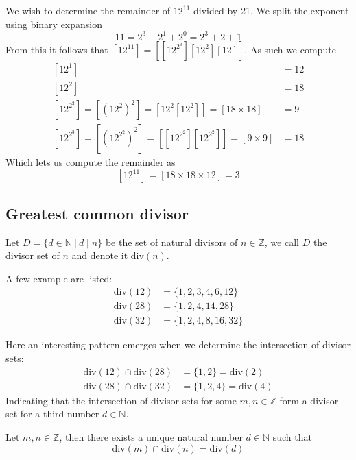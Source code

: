 \begin{exmp}
    We wish to determine the remainder of $12^{11}$ divided by 21. We split the exponent using binary expansion
    \[
        11=2^{3}+2^{1}+2^{0}=2^{3}+2+1
    \]
    From this it follows that $\left[12^{11}\right]=\left[\left[12^{2^{3}}\right]\left[12^{2}\right]\left[12\right]\right]$. As such we compute
    \begin{align*}
        \left[12^{1}\right]&=12 \\
        \left[12^{2}\right]&=18 \\
        \left[12^{2^{2}}\right]=\left[(12^{2})^{2}\right]=\left[12^{2}\left[12^{2}\right]\right]=\left[18\times 18\right]&=9 \ \\
        \left[12^{2^{3}}\right]=\left[\left(12^{2^{2}}\right)^{2}\right]=\left[\left[12^{2^{2}}\right]\left[12^{2^{2}}\right]\right]=\left[9\times 9\right]&=18
    \end{align*}
    Which lets us compute the remainder as
    \[
        \left[12^{11}\right]=\left[18\times 18\times 12\right]=3
    \]
\end{exmp}
\pagebreak\subsection{Greatest common divisor}
\begin{defi}
    Let $D=\{d\in\mathbb{N}~|~d\mid n\}$ be the set of natural divisors of $n\in\mathbb{Z}$, we call $D$ the divisor set of $n$ and denote it $\text{div}(n)$.
\end{defi}
\begin{exmp}
    A few example are listed:
    \begin{align*}
        \text{div}(12)&=\{1,2,3,4,6,12\} \\
        \text{div}(28)&=\{1,2,4,14,28\} \\
        \text{div}(32)&=\{1,2,4,8,16,32\}
    \end{align*}\vskip -10pt
\end{exmp}
Here an interesting pattern emerges when we determine the intersection of divisor sets:
\begin{align*}
    \text{div}(12)\cap\text{div}(28)&=\{1,2\}=\text{div}(2) \\
    \text{div}(28)\cap\text{div}(32)&=\{1,2,4\}=\text{div}(4)
\end{align*}
Indicating that the intersection of divisor sets for some $m,n\in\mathbb{Z}$ form a divisor set for a third number $d\in\mathbb{N}$.
\begin{lemm}[Euclid]
    Let $m,n\in\mathbb{Z}$, then there exists a unique natural number $d\in\mathbb{N}$ such that
    \[
        \text{div}(m)\cap\text{div}(n)=\text{div}(d)
    \]
\end{lemm}
